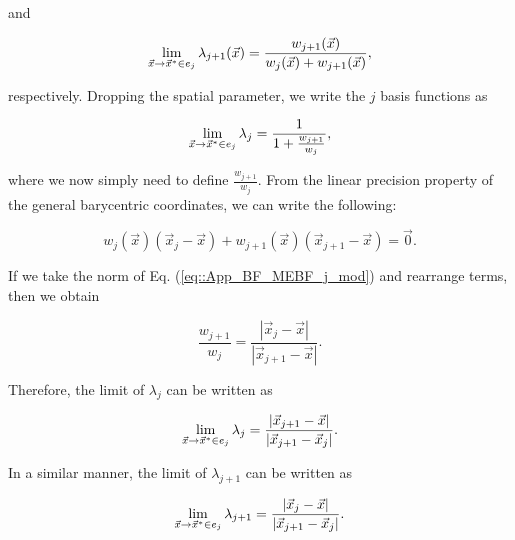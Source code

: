 \noindent and

\begin{equation}
\label{eq::App_BF_MEBF_j1}
\lim\displaylimits_{\vec{x} \rightarrow \vec{x}^* \in e_j} \lambda_{j+1} (\vec{x}) = \frac{w_{j+1}  (\vec{x}) }{w_j  (\vec{x}) +w_{j+1}  (\vec{x}) },
\end{equation}

\noindent respectively. Dropping the spatial parameter, we write the $j$ basis functions as 

\begin{equation}
\label{eq::App_BF_MEBF_j_mod}
\lim\displaylimits_{\vec{x} \rightarrow \vec{x}^* \in e_j} \lambda_{j}  = \frac{1 }{1 + \frac{w_{j+1}}{w_j} },
\end{equation}

\noindent where we now simply need to define $\frac{w_{j+1}}{w_j}$. From the linear precision property of the general barycentric coordinates, we can write the following:

\begin{equation}
\label{eq::App_BF_MEBF_j_mod}
w_j  (\vec{x})  \left( \vec{x}_j - \vec{x} \right) + w_{j+1}  (\vec{x})  \left( \vec{x}_{j+1} - \vec{x} \right) = \vec{0}.
\end{equation}

\noindent If we take the norm of Eq. (\ref{eq::App_BF_MEBF_j_mod}) and rearrange terms, then we obtain

\begin{equation}
\label{eq::App_BF_MEBF_wj_wj1}
\frac{w_{j+1}}{w_j} = \frac{|\vec{x}_j - \vec{x}| }{|\vec{x}_{j+1} - \vec{x}| }.
\end{equation}

\noindent Therefore, the limit of $\lambda_j$ can be written as 

\begin{equation}
\label{eq::App_BF_MEBF_j_mod2}
\lim\displaylimits_{\vec{x} \rightarrow \vec{x}^* \in e_j} \lambda_{j}=\frac{|\vec{x}_{j+1} - \vec{x}|  }{|\vec{x}_{j+1} - \vec{x}_j| }.
\end{equation}

\noindent In a similar manner, the limit of $\lambda_{j+1}$ can be written as

\begin{equation}
\label{eq::App_BF_MEBF_j1_mod2}
\lim\displaylimits_{\vec{x} \rightarrow \vec{x}^* \in e_j} \lambda_{j+1}=\frac{|\vec{x}_{j} - \vec{x}|  }{|\vec{x}_{j+1} - \vec{x}_j| }.
\end{equation}

